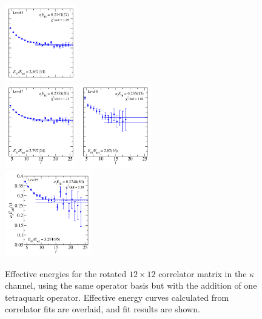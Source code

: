 \begin{figure}
  \includegraphics[width=0.28\textwidth]{figures/spectrum_a1g/with_tq/fits/fit_5.pdf}\\
  \includegraphics[width=0.28\textwidth]{figures/spectrum_a1g/with_tq/fits/fit_6.pdf}
  \includegraphics[width=0.28\textwidth]{figures/spectrum_a1g/with_tq/fits/fit_7.pdf}\\
  \includegraphics[width=0.34\textwidth]{figures/spectrum_a1g/with_tq/fits/fit_9.pdf}
  \caption{Effective energies for the rotated $12\times 12$ correlator matrix in the $\kappa$ channel, using the same operator basis but with the addition of one tetraquark operator. Effective energy curves calculated from correlator fits are overlaid, and fit results are shown.}
  \label{fig:kappa_with_tq_grid}
\end{figure}

